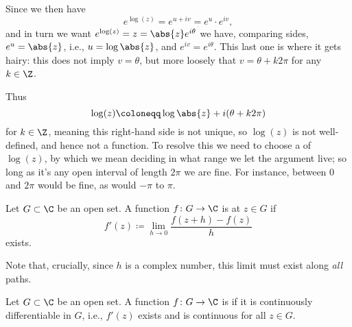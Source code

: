 Since we then have
\[
	e^{\log(z)} = e^{u + i v} = e^u \cdot e^{i v},
\]
and in turn we want $e^{\log(z)} = z = \abs{z} e^{i \theta}$ we have, comparing sides, $e^u = \abs{z}$, i.e., $u = \log\abs{z}$, and $e^{i v} = e^{i \theta}$.
This last one is where it gets hairy: this does not imply $v = \theta$, but more loosely that $v = \theta + k 2 \pi$ for any $k \in \Z$.

Thus
\[
	\log(z) \coloneqq \log\abs{z} + i(\theta + k 2 \pi)
\]
for $k \in \Z$, meaning this right-hand side is not unique, so $\log(z)$ is not well-defined, and hence not a function.
To resolve this we need to choose a  of $\log(z)$, by which we mean deciding in what range we let the argument live; so long as it's any open interval of length $2 \pi$ we are fine.
For instance, between $0$ and $2 \pi$ would be fine, as would $-\pi$ to $\pi$.


\begin{definition}
	Let $G \subset \C$ be an open set.
	A function $f \colon G \to \C$ is  at $z \in G$ if
	\[
		f'(z) \coloneqq \lim_{h \to 0} \frac{f(z + h) - f(z)}{h}
	\]
	exists.
\end{definition}
Note that, crucially, since $h$ is a complex number, this limit must exist along \emph{all} paths.

\begin{definition}
	Let $G \subset \C$ be an open set.
	A function $f \colon G \to \C$ is  if it is continuously differentiable in $G$, i.e., $f'(z)$ exists and is continuous for all $z \in G$.
\end{definition}

